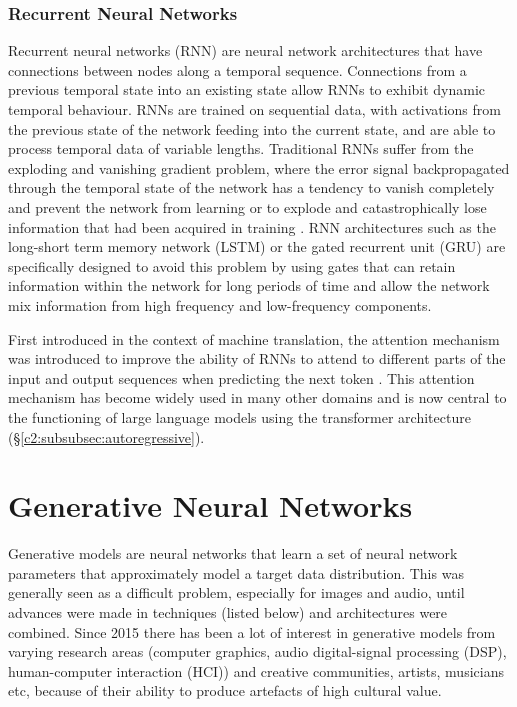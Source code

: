 \subsubsection{Recurrent Neural Networks}
\label{c2:subsubsec:rnn}

Recurrent neural networks (RNN) are neural network architectures that have connections between nodes along a temporal sequence. 
Connections from a previous temporal state into an existing state allow RNNs to exhibit dynamic temporal behaviour. RNNs are trained on sequential data, with activations from the previous state of the network feeding into the current state, and are able to process temporal data of variable lengths. 
Traditional RNNs suffer from the exploding and vanishing gradient problem, where the error signal backpropagated through the temporal state of the network has a tendency to vanish completely and prevent the network from learning or to explode and catastrophically lose information that had been acquired in training \cite{hochreiter1998vanishing}. 
RNN architectures such as the long-short term memory network (LSTM) \citep{hochreiter1997long} or the gated recurrent unit (GRU) \citep{cho2014properties} are specifically designed to avoid this problem by using gates that can retain information within the network for long periods of time and allow the network mix information from high frequency and low-frequency components. 

First introduced in the context of machine translation, the attention mechanism was introduced to improve the ability of RNNs to attend to different parts of the input and output sequences when predicting the next token \citep{bahdanau2014neural}. 
This attention mechanism has become widely used in many other domains and is now central to the functioning of large language models using the transformer architecture (\S \ref{c2:subsubsec:autoregressive}).

 
\section{Generative Neural Networks}
\label{c2:sec:gen-nn}

Generative models are neural networks that learn a set of neural network parameters that approximately model a target data distribution. 
This was generally seen as a difficult problem, especially for images and audio, until advances were made in techniques (listed below) and architectures were combined. 
Since 2015 there has been a lot of interest in generative models from varying research areas (computer graphics, audio digital-signal processing (DSP), human-computer interaction (HCI)) and creative communities, artists, musicians etc, because of their ability to produce artefacts of high cultural value. 

